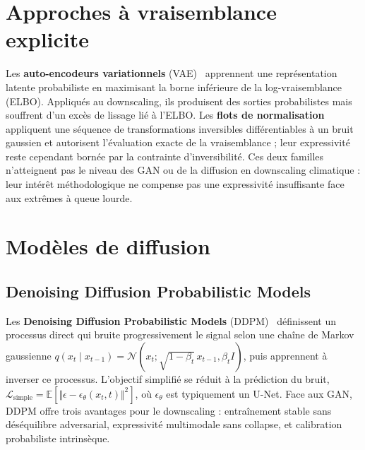 \documentclass[14pt,a4paper,openany]{extreport}
\begin{document}
\section{Approches à vraisemblance explicite}
\label{sec:soa-vrai}

Les \textbf{auto-encodeurs variationnels} (VAE)~\cite{kingma_vae_2014} apprennent une représentation latente probabiliste en maximisant la borne inférieure de la log-vraisemblance (ELBO). Appliqués au downscaling, ils produisent des sorties probabilistes mais souffrent d'un excès de lissage lié à l'ELBO. Les \textbf{flots de normalisation} appliquent une séquence de transformations inversibles différentiables à un bruit gaussien et autorisent l'évaluation exacte de la vraisemblance ; leur expressivité reste cependant bornée par la contrainte d'inversibilité. Ces deux familles n'atteignent pas le niveau des GAN ou de la diffusion en downscaling climatique : leur intérêt méthodologique ne compense pas une expressivité insuffisante face aux extrêmes à queue lourde.\label{ssec:soa-vae}\label{ssec:soa-flow}\label{ssec:soa-vrai-bilan}

\section{Modèles de diffusion}
\label{sec:soa-diff}

\subsection{Denoising Diffusion Probabilistic Models}
\label{ssec:soa-ddpm}

Les \textbf{Denoising Diffusion Probabilistic Models} (DDPM)~\cite{ho_ddpm_2020} définissent un processus direct qui bruite progressivement le signal selon une chaîne de Markov gaussienne $q(x_t \mid x_{t-1}) = \mathcal{N}(x_t; \sqrt{1 - \beta_t}\, x_{t-1}, \beta_t I)$, puis apprennent à inverser ce processus. L'objectif simplifié se réduit à la prédiction du bruit, $\mathcal{L}_{\mathrm{simple}} = \mathbb{E}[\Vert \epsilon - \epsilon_\theta(x_t, t)\Vert^2]$, où $\epsilon_\theta$ est typiquement un U-Net. Face aux GAN, DDPM offre trois avantages pour le downscaling : entraînement stable sans déséquilibre adversarial, expressivité multimodale sans collapse, et calibration probabiliste intrinsèque.
\end{document}
